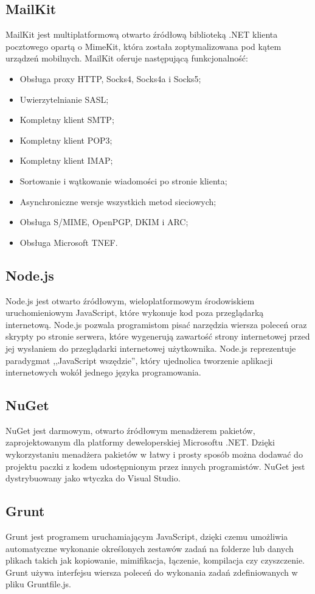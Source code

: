 \documentclass[12pt,a4paper]{article}
\begin{document}
		\subsection{MailKit}
			\indent MailKit jest multiplatformową otwarto źródłową biblioteką .NET klienta pocztowego opartą o MimeKit, która została zoptymalizowana pod kątem urządzeń mobilnych.
			MailKit oferuje następującą funkcjonalność:
			\begin{itemize}
				\item Obsługa proxy HTTP, Socks4, Socks4a i Socks5;
				\item Uwierzytelnianie SASL;
				\item Kompletny klient SMTP;
				\item Kompletny klient POP3;
				\item Kompletny klient IMAP;
				\item Sortowanie i wątkowanie wiadomości po stronie klienta;
				\item Asynchroniczne wersje wszystkich metod sieciowych;
				\item Obsługa S/MIME, OpenPGP, DKIM i ARC;
				\item Obsługa Microsoft TNEF.
			\end{itemize}
		\subsection{Node.js}
			\indent Node.js jest otwarto źródłowym, wieloplatformowym środowiskiem uruchomieniowym JavaScript, które wykonuje kod poza przeglądarką internetową. Node.js pozwala
			programistom pisać narzędzia wiersza poleceń oraz skrypty po stronie serwera, które wygenerują zawartość strony internetowej przed jej wysłaniem do przeglądarki
			internetowej użytkownika. Node.js reprezentuje paradygmat ,,JavaScript wszędzie'', który ujednolica tworzenie aplikacji internetowych wokół jednego języka programowania. 
		\subsection{NuGet}
			\indent NuGet jest darmowym, otwarto źródłowym menadżerem pakietów, zaprojektowanym dla platformy deweloperskiej Microsoftu .NET. Dzięki wykorzystaniu menadżera pakietów
			w łatwy i prosty sposób można dodawać do projektu paczki z kodem udostępnionym przez innych programistów. NuGet jest dystrybuowany jako wtyczka do Visual Studio.
		\subsection{Grunt}
			\indent Grunt jest programem uruchamiającym JavaScript, dzięki czemu umożliwia automatyczne wykonanie określonych zestawów zadań na folderze lub danych plikach takich jak
			kopiowanie,	mimifikacja, łączenie, kompilacja czy czyszczenie. Grunt używa interfejsu wiersza poleceń do wykonania zadań zdefiniowanych w pliku Gruntfile.js. 
\end{document}
